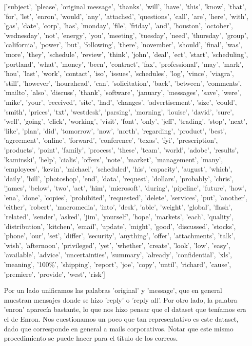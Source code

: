 \documentclass[10pt,a4paper]{article}
\begin{document}
['subject', 'please', 'original message', 'thanks', 'will', 'have', 'this', 'know', 'that', 'for', 'let', 'enron', 'would', 'any', 'attached', 'questions', 'call', 'are', 'here', 'with', 'gas', 'date', 'corp', 'has', 'monday', 'file', 'friday', 'and', 'houston', 'october', 'wednesday', 'not', 'energy', 'you', 'meeting', 'tuesday', 'need', 'thursday', 'group', 'california', 'power', 'but', 'following', 'there', 'november', 'should', 'final', 'was', 'more', 'they', 'schedule', 'review', 'think', 'john', 'deal', 'ect', 'start', 'scheduling', 'portland', 'what', 'money', 'been', 'contract', 'fax', 'professional', 'may', 'mark', 'hou', 'last', 'work', 'contact', 'iso', 'issues', 'schedules', 'log', 'vince', 'viagra', 'still', 'however', 'hourahead', 'can', 'solicitation', 'back', 'between', 'comments', 'mailto', 'also', 'discuss', 'thank', 'software', 'january', 'messages', 'save', 'were', 'mike', 'your', 'received', 'site', 'had', 'changes', 'advertisement', 'size', 'could', 'smith', 'prices', 'txt', 'westdesk', 'parsing', 'morning', 'louise', 'david', 'sure', 'well', 'going', 'click', 'working', 'visit', 'font', 'only', 'jeff', 'trading', 'stop', 'next', 'like', 'plan', 'did', 'tomorrow', 'now', 'north', 'regarding', 'product', 'best', 'agreement', 'online', 'forward', 'conference', 'texas', 'fyi', 'prescription', 'products', 'point', 'family', 'process', 'these', 'team', 'world', 'adobe', 'results', 'kaminski', 'help', 'cialis', 'offers', 'note', 'market', 'management', 'many', 'employees', 'kevin', 'michael', 'scheduled', 'his', 'capacity', 'august', 'which', 'daily', 'bill', 'photoshop', 'end', 'data', 'request', 'dollars', 'probably', 'chris', 'james', 'below', 'two', 'act', 'him', 'microsoft', 'during', 'pipeline', 'future', 'how', 'ena', 'done', 'copies', 'prohibited', 'requested', 'delete', 'services', 'put', 'another', 'either', 'robert', 'macromedia', 'into', 'desk', 'able', 'weight', 'global', 'flash', 'related', 'sender', 'asked', 'jim', 'yourself', 'hope', 'markets', 'each', 'quality', 'distribution', 'kitchen', 'email', 'update', 'might', 'good', 'discussed', 'stocks', 'phone', 'our', 'set', 'differ', 'security', 'anything', 'offer', 'attachments', 'talk', 'wish', 'afternoon', 'privileged', 'yet', 'whether', 'create', 'look', 'low', 'easy', 'available', 'advice', 'uncertainties', 'summary', 'already', 'confidential', 'xls', 'meaning', '100\%', 'shipping', 'report', 'joe', 'copy', 'until', 'richard', 'cause', 'premiere', 'provide', 'west', 'risk']


\pagebreak

Por un lado unificamos las palabras 'original' y 'message', que en general muestran mensajes donde se hizo 'reply' o 'reply all'. Por otro lado, la palabra 'enron' aparecía bastante, lo que nos hizo pensar que el dataset que teníamos era el de Enron. Nos cuestionamos un poco que tan representativo es este dataset, dado que corresponde en general a mails corporativos. Notar que este mismo procedimiento se puede hacer para el título de los correos.
\end{document}

